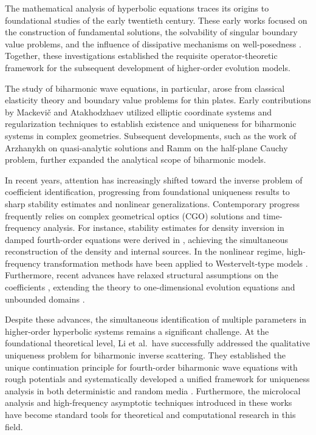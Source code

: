 \documentclass[12pt,reqno]{amsart}
\numberwithin{equation}{section}
\begin{document}
	The mathematical analysis of hyperbolic equations traces its origins to foundational studies of the early twentieth century. These early works focused on the construction of fundamental solutions, the solvability of singular boundary value problems, and the influence of dissipative mechanisms on well-posedness \cite{MR1577376, MR1577103, MR3908, MR28496, MR21214}. Together, these investigations established the requisite operator-theoretic framework for the subsequent development of higher-order evolution models. 
	
	The study of biharmonic wave equations, in particular, arose from classical elasticity theory and boundary value problems for thin plates. Early contributions by Mackevi\v{c} and Atakhodzhaev \cite{Atahodzaev1974} utilized elliptic coordinate systems and regularization techniques to establish existence and uniqueness for biharmonic systems in complex geometries. Subsequent developments, such as the work of Arzhanykh \cite{Arzhanykh1978} on quasi-analytic solutions and Ramm \cite{Ramm1988} on the half-plane Cauchy problem, further expanded the analytical scope of biharmonic models.
	
	In recent years, attention has increasingly shifted toward the inverse problem of coefficient identification, progressing from foundational uniqueness results to sharp stability estimates and nonlinear generalizations. Contemporary progress frequently relies on complex geometrical optics (CGO) solutions and time-frequency analysis. For instance, stability estimates for density inversion in damped fourth-order equations were derived in \cite{MR4598840, Liu2025FourthOrderSchrodinger}, achieving the simultaneous reconstruction of the density and internal sources. In the nonlinear regime, high-frequency transformation methods have been applied to Westervelt-type models \cite{Acosta2025Westervelt}. Furthermore, recent advances have relaxed structural assumptions on the coefficients \cite{MR4959941}, extending the theory to one-dimensional evolution equations \cite{Kian2025WaveEquation} and unbounded domains \cite{MR4848562}.

Despite these advances, the simultaneous identification of multiple parameters in 
higher-order hyperbolic systems remains a significant challenge. At the foundational 
theoretical level, Li et al.\ have successfully addressed the qualitative uniqueness 
problem for biharmonic inverse scattering. They established the unique continuation 
principle for fourth-order biharmonic wave equations with rough potentials and 
systematically developed a unified framework for uniqueness analysis in both 
deterministic and random media \cite{li2026sampling, li2026stability, wang2025adaptive, 
harris2025direct, li2025nonradiating, dong2024uniqueness, dong2024novel}. Furthermore, 
the microlocal analysis and high-frequency asymptotic techniques introduced in these 
works have become standard tools for theoretical and computational research in this field.
\end{document}
